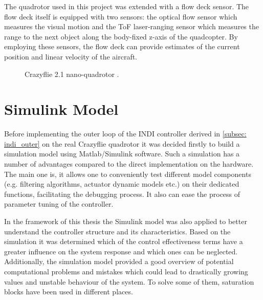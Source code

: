 \documentclass[11pt, a4paper, twoside]{report}
\begin{document}
The quadrotor used in this project was extended with a flow deck sensor. The flow deck itself is equipped with two sensors: the optical flow sensor which measures the visual motion and the \acrfull{ToF} laser-ranging sensor which measures the range to the next object along the body-fixed z-axis of the quadcopter. By employing these sensors, the flow deck can provide estimates of the current position and linear velocity of the aircraft.

\begin{figure}[H]
	\centering 
	\captionsetup{justification=centering, singlelinecheck=off, font=bf, belowskip=-0.5cm}
	\caption[Crazyflie 2.1 nano-quadrotor]{Crazyflie 2.1 nano-quadrotor \cite{bitcraze}.}
	\label{fig:crazyflie_drone}
\end{figure}

\section{Simulink Model} \label{sec:simulink_model}

Before implementing the outer loop of the \acrshort{INDI} controller derived in \ref{subsec: indi_outer} on the real Crazyflie quadrotor it was decided firstly to build a simulation model using Matlab/Simulink software. Such a simulation has a number of advantages compared to the direct implementation on the hardware. The main one is, it allows one to conveniently test different model components (e.g. filtering algorithms, actuator dynamic models etc.) on their dedicated functions, facilitating the debugging process. It also can ease the process of parameter tuning of the controller. 

In the framework of this thesis the Simulink model was also applied to better understand the controller structure and its characteristics. Based on the simulation it was determined which of the control effectiveness terms have a greater influence on the system response and which ones can be neglected. Additionally, the simulation model provided a good overview of potential computational problems and mistakes which could lead to drastically growing values and unstable behaviour of the system. To solve some of them, saturation blocks have been used  in different places.
\end{document}
